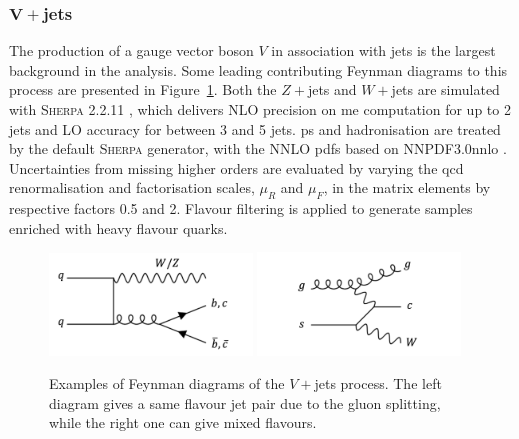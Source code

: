 \subsubsection{$\boldsymbol{V+}$jets}
The production of a gauge vector boson $V$ in association with jets is the largest background in the analysis. Some leading contributing Feynman diagrams to this process are presented in Figure~\ref{fig:feynVJ}. Both the $Z+$jets and $W+$jets are simulated with \textsc{Sherpa} 2.2.11 \cite{10.21468/SciPostPhys.7.3.034}, which delivers NLO precision on \gls{me} computation for up to 2 jets and LO accuracy for between 3 and 5 jets. \gls{ps} and hadronisation are treated by the default \textsc{Sherpa} generator, with the NNLO \gls{pdf}s based on NNPDF3.0nnlo \cite{PDFLHCrun2}. Uncertainties from missing higher orders are evaluated by varying the \gls{qcd} renormalisation and factorisation scales, $\mu_R$ and $\mu_F$, in the matrix elements by respective factors 0.5 and 2. Flavour filtering is applied to generate samples enriched with heavy flavour quarks.

\begin{figure}[h!]
  \center
  \includegraphics[width=0.48\textwidth]{Images/VH/Feynman/vjet.png}
  \includegraphics[width=0.48\textwidth]{Images/VH/Feynman/vjet2.png}
  \caption{Examples of Feynman diagrams of the $V+$jets process. The left diagram gives a same flavour jet pair due to the gluon splitting, while the right one can give mixed flavours.} 
  \label{fig:feynVJ}
\end{figure}

